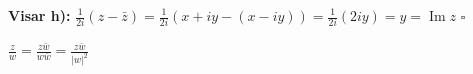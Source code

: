 \textbf{Visar h):} $\frac{1}{2i}(z - \bar{z}) = \frac{1}{2i}(x + iy - (x - iy)) = \frac{1}{2i}(2iy) = y = \operatorname{Im} z$ \hfill $\square$

\begin{note}
$\displaystyle \frac{z}{w} = \frac{z\bar{w}}{w\bar{w}} = \frac{z\bar{w}}{|w|^2}$
\end{note}
